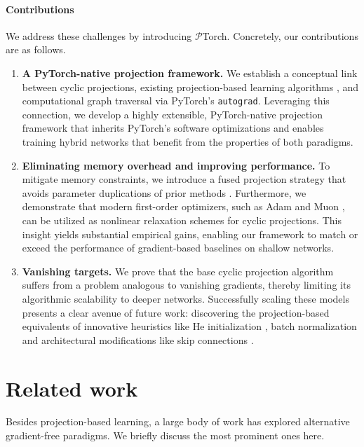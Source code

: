 \paragraph{Contributions} We address these challenges by introducing $\mathcal{P}$Torch. Concretely, our contributions are as follows.
\begin{enumerate}
    \item \textbf{A PyTorch-native projection framework.}
    We establish a conceptual link between cyclic projections, existing projection-based learning algorithms \cite{elser2019learning,bergmeister2025projection}, and computational graph traversal via PyTorch's \texttt{autograd}. Leveraging this connection, we develop a highly extensible, PyTorch-native projection framework that inherits PyTorch's software optimizations and enables training hybrid networks that benefit from the properties of both paradigms.
    
    \item \textbf{Eliminating memory overhead and improving performance.} To mitigate memory constraints, we introduce a fused projection strategy that avoids parameter duplications of prior methods \cite{elser2019learning, bergmeister2025projection}. Furthermore, we demonstrate that modern first-order optimizers, such as Adam \cite{kingma2014adam} and Muon \cite{jordan2024muon}, can be utilized as nonlinear relaxation schemes for cyclic projections. This insight yields substantial empirical gains, enabling our framework to match or exceed the performance of gradient-based baselines on shallow networks. 
    \item \textbf{Vanishing targets.}
    We prove that the base cyclic projection algorithm suffers from a problem analogous to vanishing gradients, thereby limiting its algorithmic scalability to deeper networks. Successfully scaling these models presents a clear avenue of future work: discovering the projection-based equivalents of innovative heuristics like He initialization \cite{delving}, batch normalization \cite{ioffe2015batch} and architectural modifications like skip connections \cite{he2016deep}.
\end{enumerate}
\section{Related work}
Besides projection-based learning, a large body of work has explored alternative gradient-free paradigms. We briefly discuss the most prominent ones here.
